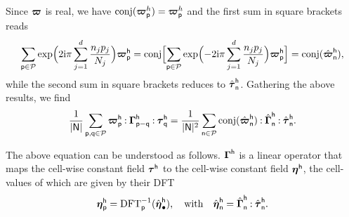Since \(\boldsymbol\varpi\) is real, we have
\(\operatorname{conj}(\boldsymbol\varpi_{\mathsf p}^h)=\boldsymbol\varpi_{\mathsf p}^h\) and the first sum
in square brackets reads
\begin{equation}
  \sum_{\mathsf{p}\in\mathcal{P}}\exp\Bigl(2\mathrm i\pi\sum_{j=1}^d\frac{n_jp_j}{N_j}\Bigr)
  \boldsymbol\varpi_{\mathsf p}^{\mathsf h}=\operatorname{conj}\Bigl[\sum_{\mathsf{p}\in\mathcal{P}}
  \exp\Bigl(-2\mathrm i\pi\sum_{j=1}^d\frac{n_jp_j}{N_j}\Bigr)
  \boldsymbol\varpi_{\mathsf p}^{\mathsf h}\Bigr]
  =\operatorname{conj}(\hat{\boldsymbol\varpi}_{\mathsf n}^{\mathsf h}),
\end{equation}
while the second sum in square brackets reduces to \(\hat{\boldsymbol\tau}_{\mathsf
  n}^{\mathsf h}\). Gathering the above results, we find
\begin{equation}
  \frac{1}{\lvert\mathsf N\rvert}\sum_{\mathsf p, \mathsf q\in\mathcal{P}}
  \boldsymbol\varpi_{\mathsf p}^{\mathsf h}\mathbin{\mathord{:}}\boldsymbol\Gamma_{\mathsf p-\mathsf q}^{\mathsf h}
  \mathbin{\mathord{:}}\boldsymbol\tau_{\mathsf q}^{\mathsf h}=\frac1{\lvert\mathsf N\rvert^2}
  \sum_{\mathsf n\in\mathcal{P}}\operatorname{conj}(\hat{\boldsymbol\varpi}_{\mathsf n}^{\mathsf h})
  \mathbin{\mathord{:}}\hat{\boldsymbol\Gamma}_{\mathsf n}^{\mathsf h}\mathbin{\mathord{:}}
  \hat{\boldsymbol\tau}_{\mathsf n}^{\mathsf h}.
\end{equation}

The above equation can be understood as follows. \(\boldsymbol\Gamma^{\mathsf h}\) is a
linear operator that maps the cell-wise constant field \(\boldsymbol\tau^{\mathsf h}\)
to the cell-wise constant field \(\boldsymbol\eta^{\mathsf h}\), the cell-values of
which are given by their DFT
\begin{equation}
  \boldsymbol{\eta}_{\mathsf p}^{\mathsf h}=
  \operatorname{DFT}^{-1}_{\mathsf p}(\hat{\boldsymbol\eta}_{\bullet}^{\mathsf h}),\quad\text{with}
  \quad\hat{\boldsymbol\eta}_{\mathsf n}^{\mathsf h}
  =\hat{\boldsymbol\Gamma}_{\mathsf n}^{\mathsf h}\mathbin{\mathord{:}}
  \hat{\boldsymbol\tau}_{\mathsf n}^{\mathsf h}.
\end{equation}

